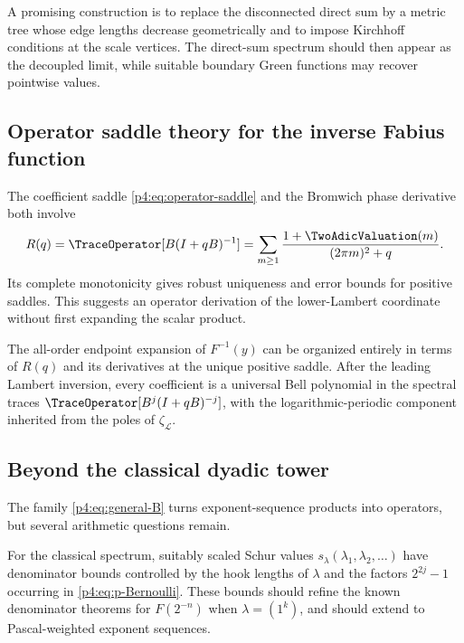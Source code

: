 \documentclass[11pt]{article}
\theoremstyle{definition}
\theoremstyle{remark}
\begin{document}
A promising construction is to replace the disconnected direct sum by a metric tree
whose edge lengths decrease geometrically and to impose Kirchhoff conditions at the
scale vertices.  The direct-sum spectrum should then appear as the decoupled limit,
while suitable boundary Green functions may recover pointwise values.

\subsection{Operator saddle theory for the inverse Fabius function}

The coefficient saddle \eqref{p4:eq:operator-saddle} and the Bromwich phase derivative
both involve
\begin{equation}
 R(q)=\TraceOperator[B(I+qB)^{-1}]
 =\sum_{m\ge1}\frac{1+\TwoAdicValuation(m)}{(2\pi m)^2+q}.
 \label{p4:eq:Rq}
\end{equation}
Its complete monotonicity gives robust uniqueness and error bounds for positive
saddles.  This suggests an operator derivation of the lower-Lambert coordinate without
first expanding the scalar product.

\begin{conjecture}
\label{p4:conj:inverse-resolvent}
The all-order endpoint expansion of \(F^{-1}(y)\) can be organized entirely in terms
of \(R(q)\) and its derivatives at the unique positive saddle.  After the leading
Lambert inversion, every coefficient is a universal Bell polynomial in the spectral
traces \(\TraceOperator[B^j(I+qB)^{-j}]\), with the logarithmic-periodic component inherited from
the poles of \(\zeta_{\mathscr L}\).
\end{conjecture}

\subsection{Beyond the classical dyadic tower}

The family \eqref{p4:eq:general-B} turns exponent-sequence products into operators, but
several arithmetic questions remain.

\begin{conjecture}
\label{p4:conj:Schur-arithmetic}
For the classical spectrum, suitably scaled Schur values
\(s_{\lambda}(\lambda_1,\lambda_2,\ldots)\) have denominator bounds controlled by the
hook lengths of \(\lambda\) and the factors \(2^{2j}-1\) occurring in
\eqref{p4:eq:p-Bernoulli}.  These bounds should refine the known denominator theorems for
\(F(2^{-n})\) when \(\lambda=(1^k)\), and should extend to Pascal-weighted exponent
sequences.
\end{conjecture}
\end{document}
